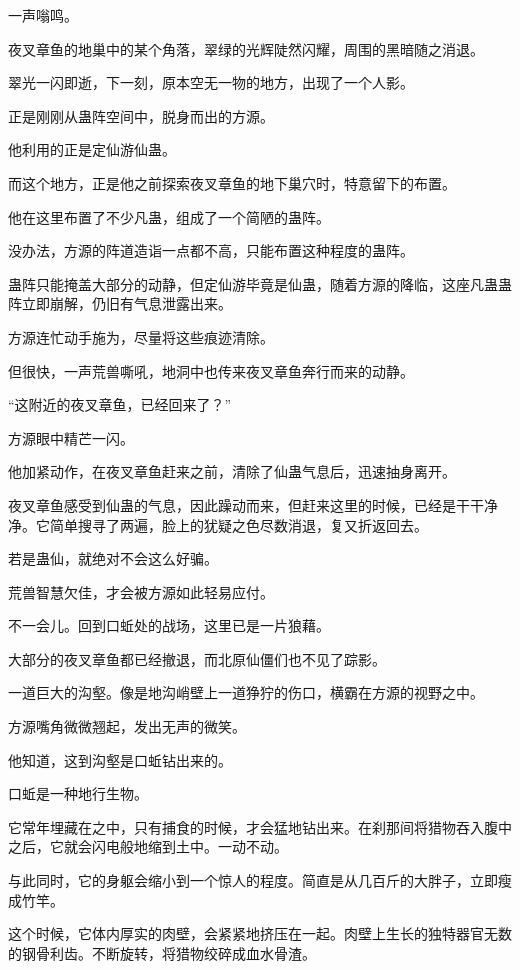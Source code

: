
\begin{this_body}

一声嗡鸣。

夜叉章鱼的地巢中的某个角落，翠绿的光辉陡然闪耀，周围的黑暗随之消退。

翠光一闪即逝，下一刻，原本空无一物的地方，出现了一个人影。

正是刚刚从蛊阵空间中，脱身而出的方源。

他利用的正是定仙游仙蛊。

而这个地方，正是他之前探索夜叉章鱼的地下巢穴时，特意留下的布置。

他在这里布置了不少凡蛊，组成了一个简陋的蛊阵。

没办法，方源的阵道造诣一点都不高，只能布置这种程度的蛊阵。

蛊阵只能掩盖大部分的动静，但定仙游毕竟是仙蛊，随着方源的降临，这座凡蛊蛊阵立即崩解，仍旧有气息泄露出来。

方源连忙动手施为，尽量将这些痕迹清除。

但很快，一声荒兽嘶吼，地洞中也传来夜叉章鱼奔行而来的动静。

“这附近的夜叉章鱼，已经回来了？”

方源眼中精芒一闪。

他加紧动作，在夜叉章鱼赶来之前，清除了仙蛊气息后，迅速抽身离开。

夜叉章鱼感受到仙蛊的气息，因此躁动而来，但赶来这里的时候，已经是干干净净。它简单搜寻了两遍，脸上的犹疑之色尽数消退，复又折返回去。

若是蛊仙，就绝对不会这么好骗。

荒兽智慧欠佳，才会被方源如此轻易应付。

不一会儿。回到口蚯处的战场，这里已是一片狼藉。

大部分的夜叉章鱼都已经撤退，而北原仙僵们也不见了踪影。

一道巨大的沟壑。像是地沟峭壁上一道狰狞的伤口，横霸在方源的视野之中。

方源嘴角微微翘起，发出无声的微笑。

他知道，这到沟壑是口蚯钻出来的。

口蚯是一种地行生物。

它常年埋藏在之中，只有捕食的时候，才会猛地钻出来。在刹那间将猎物吞入腹中之后，它就会闪电般地缩到土中。一动不动。

与此同时，它的身躯会缩小到一个惊人的程度。简直是从几百斤的大胖子，立即瘦成竹竿。

这个时候，它体内厚实的肉壁，会紧紧地挤压在一起。肉壁上生长的独特器官无数的钢骨利齿。不断旋转，将猎物绞碎成血水骨渣。


\end{this_body}
